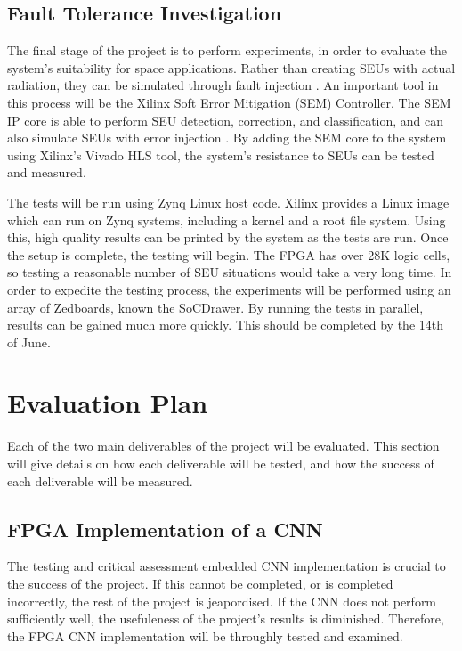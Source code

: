 \documentclass[12pt]{article}
\begin{document}
\subsection{Fault Tolerance Investigation}
\label{sec:ImpPlan-FaultTolInv}
\vspace{-12pt}

The final stage of the project is to perform experiments, in order to evaluate the system's suitability for space applications. Rather than creating SEUs with actual radiation, they can be simulated through fault injection \cite{FaultInjection}. An important tool in this process will be the Xilinx Soft Error Mitigation (SEM) Controller. The SEM IP core is able to perform SEU detection, correction, and classification, and can also simulate SEUs with error injection \cite{ManualSEM}. By adding the SEM core to the system using Xilinx's Vivado HLS tool, the system's resistance to SEUs can be tested and measured. 

The tests will be run using Zynq Linux host code. Xilinx provides a Linux image which can run on Zynq systems, including a kernel and a root file system. Using this, high quality results can be printed by the system as the tests are run. Once the setup is complete, the testing will begin. The FPGA has over 28K logic cells, so testing a reasonable number of SEU situations would take a very long time. In order to expedite the testing process, the experiments will be performed using an array of Zedboards, known the SoCDrawer. By running the tests in parallel, results can be gained much more quickly. This should be completed by the 14th of June.

\section{Evaluation Plan}
\label{sec:EvalPlan}
\vspace{-12pt}

Each of the two main deliverables of the project will be evaluated. This section will give details on how each deliverable will be tested, and how the success of each deliverable will be measured.

\subsection{FPGA Implementation of a CNN}
\label{sec:EvalPlan-FPGAImplOfCnn}
\vspace{-12pt}

The testing and critical assessment embedded CNN implementation is crucial to the success of the project. If this cannot be completed, or is completed  incorrectly, the rest of the project is jeapordised. If the CNN does not perform sufficiently well, the usefuleness of the project's results is diminished. Therefore, the FPGA CNN implementation will be throughly tested and examined.
\end{document}
